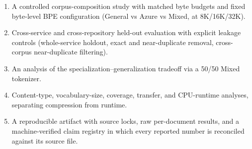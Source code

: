 \begin{enumerate}
  \item A controlled corpus-composition study with matched byte budgets and fixed
  byte-level BPE configuration (General vs Azure vs Mixed, at 8K/16K/32K).
  \item Cross-service and cross-repository held-out evaluation with explicit
  leakage controls (whole-service holdout, exact and near-duplicate removal,
  cross-corpus near-duplicate filtering).
  \item An analysis of the specialization--generalization tradeoff via a 50/50
  Mixed tokenizer.
  \item Content-type, vocabulary-size, coverage, transfer, and CPU-runtime
  analyses, separating compression from runtime.
  \item A reproducible artifact with source locks, raw per-document results, and a
  machine-verified claim registry in which every reported number is reconciled
  against its source file.
\end{enumerate}
